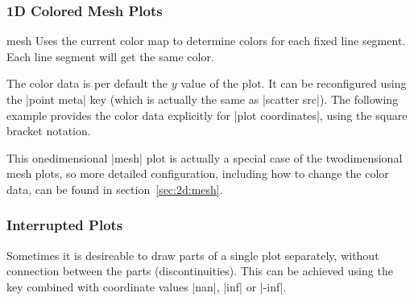 \subsubsection{1D Colored Mesh Plots}
\begin{plottype}{mesh}
	Uses the current color map to determine colors for each fixed line segment. Each line segment will get the same color.
\begin{codeexample}[]
\end{codeexample}
	The color data is per default the $y$ value of the plot. It can be reconfigured using the |point meta| key (which is actually the same as |scatter src|). The following example provides the color data explicitly for |plot coordinates|, using the square bracket notation.
\begin{codeexample}[]
\end{codeexample}
	This onedimensional |mesh| plot is actually a special case of the twodimensional mesh plots, so more detailed configuration, including how to change the color data, can be found in section~\ref{sec:2d:mesh}.

\end{plottype}


\subsubsection{Interrupted Plots}
%
Sometimes it is desireable to draw parts of a single plot separately, without connection between the parts (discontinuities). This can be achieved using the  key combined with coordinate values |nan|, |inf| or |-inf|.

